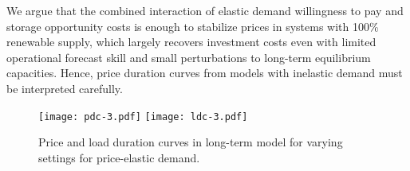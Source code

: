 \documentclass[final,3p]{elsarticle}
\begin{document}
We argue that the combined interaction of elastic demand willingness to pay and
storage opportunity costs is enough to stabilize prices in systems with 100\%
renewable supply, which largely recovers investment costs even with limited
operational forecast skill and small perturbations to long-term equilibrium
capacities. Hence, price duration curves from models with inelastic demand must
be interpreted carefully.

\vspace{1cm}

\begin{figure}[!ht]
	\centering
	\footnotesize\sffamily
	\texttt{[image: pdc-3.pdf]}
	\texttt{[image: ldc-3.pdf]}
	\caption{Price and load duration curves in long-term model for varying settings for price-elastic demand.}
	\label{fig:price-duration}
\end{figure}

\newpage 
{\normalsize

}
\end{document}
